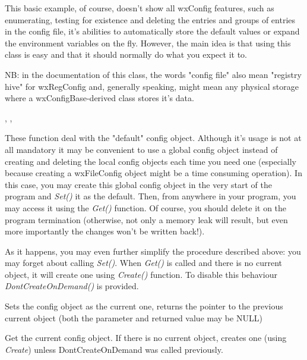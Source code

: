This basic example, of course, doesn't show all wxConfig features, such as
enumerating, testing for existence and deleting the entries and groups of
entries in the config file, it's abilities to automatically store the default
values or expand the environment variables on the fly. However, the main idea
is that using this class is easy and that it should normally do what you
expect it to.

NB: in the documentation of this class, the words "config file" also mean
"registry hive" for wxRegConfig and, generally speaking, might mean any
physical storage where a wxConfigBase-derived class stores it's data.


, , 



These function deal with the "default" config object. Although it's usage is
not at all mandatory it may be convenient to use a global config object
instead of creating and deleting the local config objects each time you need
one (especially because creating a wxFileConfig object might be a time
consuming operation). In this case, you may create this global config object
in the very start of the program and {\it Set()} it as the default. Then, from
anywhere in your program, you may access it using the {\it Get()} function. Of
course, you should delete it on the program termination (otherwise, not only a
memory leak will result, but even more importantly the changes won't be
written back!).

As it happens, you may even further simplify the procedure described above:
you may forget about calling {\it Set()}. When {\it Get()} is called and there
is no current object, it will create one using {\it Create()} function. To
disable this behaviour {\it DontCreateOnDemand()} is provided.


Sets the config object as the current one, returns the pointer to the previous
current object (both the parameter and returned value may be NULL)


Get the current config object. If there is no current object, creates one
(using {\it Create}) unless DontCreateOnDemand was called previously.

